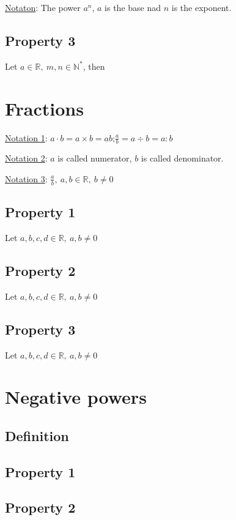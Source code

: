 \documentclass{article}
\begin{document}
\underline{Notaton}: The power $a^n$, $a$ is the base nad $n$ is the
    exponent.

\subsection{Property 3}
Let $a \in \mathbb{R},\ m,n \in \mathbb{N^*}$, then \\

\newpage
\section{Fractions}
\underline{Notation 1}: $a \cdot b = a \times b = ab$;\quad $\frac{a}{b} = a \div b = a : b$

\underline{Notation 2}: $a$ is called numerator, $b$ is called denominator.

\underline{Notation 3}: $\frac{a}{b},\ a,b \in \mathbb{R},\ b \neq 0$

\subsection{Property 1}
Let $a, b, c ,d \in \mathbb{R},\ a,b \neq 0$

\subsection{Property 2}
Let $a, b, c ,d \in \mathbb{R},\ a,b \neq 0$

\subsection{Property 3}
Let $a, b, c ,d \in \mathbb{R},\ a,b \neq 0$

\section{Negative powers}
\subsection{Definition}

\subsection{Property 1}


\subsection{Property 2}
\end{document}
